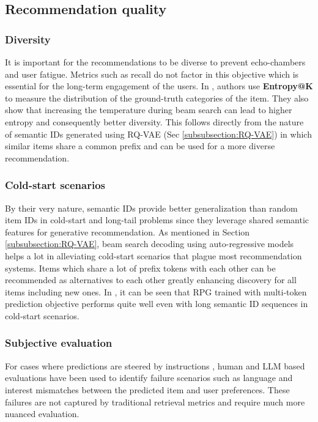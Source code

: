 \documentclass[11pt,a4paper]{article}
\begin{document}
\subsection{Recommendation quality}
\subsubsection{Diversity}
It is important for the recommendations to be diverse to prevent echo-chambers and user fatigue. Metrics such as recall do not factor in this objective which is essential for the long-term engagement of the users. In \cite{2023TIGER_rajput2023recommendersystemsgenerativeretrieval}, authors use \textbf{Entropy@K} to measure the distribution of the ground-truth categories of the item. They also show that increasing the temperature during beam search can lead to higher entropy and consequently better diversity. This follows directly from the nature of semantic IDs generated using RQ-VAE (Sec \ref{subsubsection:RQ-VAE}) in which similar items share a common prefix and can be used for a more diverse recommendation.

\subsubsection{Cold-start scenarios}
By their very nature, semantic IDs provide better generalization than random item IDs in cold-start and long-tail problems since they leverage shared semantic features for generative recommendation. As mentioned in Section \ref{subsubsection:RQ-VAE}, beam search decoding using auto-regressive models helps a lot in alleviating cold-start scenarios that plague most recommendation systems. Items which share a lot of prefix tokens with each other can be recommended as alternatives to each other greatly enhancing discovery for all items including new ones. In \cite{2025RPG_hou2025generatinglongsemanticids}, it can be seen that RPG trained with multi-token prediction objective performs quite well even with long semantic ID sequences in cold-start scenarios.

\subsubsection{Subjective evaluation}
For cases where predictions are steered by instructions \cite{2026GLIDE_damico2026deployingsemanticidbasedgenerative}, human and LLM based evaluations have been used to identify failure scenarios such as language and interest mismatches between the predicted item and user preferences. These failures are not captured by traditional retrieval metrics and require much more nuanced evaluation.
\end{document}
